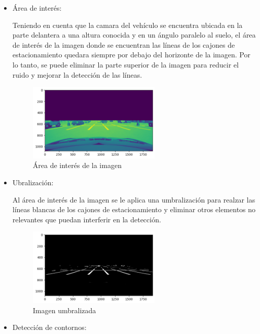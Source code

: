 \begin{itemize}
    \item Área de interés:

    Teniendo en cuenta que la camara del vehículo se encuentra ubicada en la parte delantera a una altura conocida
    y en un ángulo paralelo al suelo, el área de interés de la imagen donde se encuentran las líneas de los cajones de estacionamiento
    quedara siempre por debajo del horizonte de la imagen.
    Por lo tanto, se puede eliminar la parte superior de la imagen para
    reducir el ruido y mejorar la detección de las líneas.
    \begin{figure}[!ht]
        \centering
        \includegraphics[width=0.6\textwidth]{img/reticule/horizont}
        \caption{Área de interés de la imagen}
        \label{fig:roi}
    \end{figure}

    \item Ubralización:

    Al área de interés de la imagen se le aplica una umbralización para realzar las líneas blancas de los cajones de estacionamiento
    y eliminar otros elementos no relevantes que puedan interferir en la detección.
    \begin{figure}[!ht]
        \centering
        \includegraphics[width=0.6\textwidth]{img/reticule/thresholded}
        \caption{Imagen umbralizada}
        \label{fig:threshold}
    \end{figure}

    \clearpage
    \item Detección de contornos:


\end{itemize}
